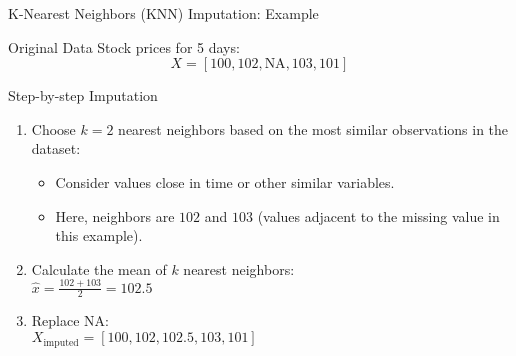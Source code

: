 \documentclass{beamer}
\begin{document}
\begin{frame}{K-Nearest Neighbors (KNN) Imputation: Example}
   \begin{block}{Original Data}
       Stock prices for 5 days:
       \[
       X = [100, 102, \text{NA}, 103, 101]
       \]
   \end{block}

   \begin{block}{Step-by-step Imputation}
       \begin{enumerate}
           \item Choose $k=2$ nearest neighbors based on the most similar observations in the dataset:
           \begin{itemize}
               \item Consider values close in time or other similar variables.
               \item Here, neighbors are $102$ and $103$ (values adjacent to the missing value in this example).
           \end{itemize}
           \item Calculate the mean of $k$ nearest neighbors:\\
           $\hat{x} = \frac{102 + 103}{2} = 102.5$
           \item Replace NA:\\
           $X_{\text{imputed}} = [100, 102, \mathbf{102.5}, 103, 101]$
       \end{enumerate}
   \end{block}

\end{frame}
\end{document}
